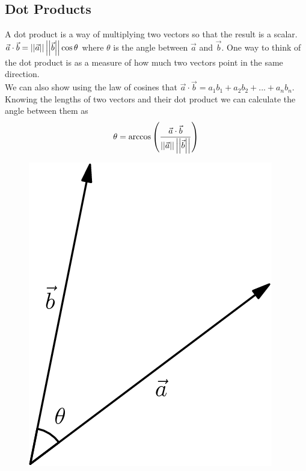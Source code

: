 \subsection{Dot Products}
\noindent
A dot product is a way of multiplying two vectors so that the result is a scalar. $\vec{a}\cdot\vec{b} = \left|\left|\vec{a}\right|\right|\left|\left|\vec{b}\right|\right|\cos{\theta}$ where $\theta$ is the angle between $\vec{a}$ and $\vec{b}$. One way to think of the dot product is as a measure of how much two vectors point in the same direction.\\
We can also show using the law of cosines that $\vec{a}\cdot\vec{b} = a_1b_1+a_2b_2+...+a_nb_n$.\\
Knowing the lengths of two vectors and their dot product we can calculate the angle between them as
\begin{equation*}
	\theta = \arccos{\left(\frac{\vec{a} \cdot \vec{b}}{\left|\left|\vec{a}\right|\right| \left|\left|\vec{b}\right|\right|}\right)}
\end{equation*}

\begin{figure}[h]
	\centering
	\includegraphics[scale=0.33]{Images/backgroundReview/DotProduct}
\end{figure}

